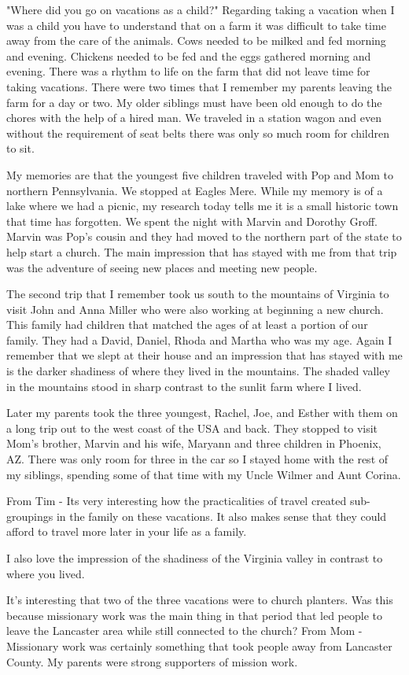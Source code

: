 "Where did you go on vacations as a child?"
Regarding taking a vacation when I was a child you have to understand that on a farm it was difficult to take time away from the care of the animals.
Cows needed to be milked and fed morning and evening.
Chickens needed to be fed and the eggs gathered morning and evening.
There was a rhythm to life on the farm that did not leave time for taking vacations.
There were two times that I remember my parents leaving the farm for a day or two.
My older siblings must have been old enough to do the chores with the help of a hired man.
We traveled in a station wagon and even without the requirement of seat belts there was only so much room for children to sit.

My memories are that the youngest five children traveled with Pop and Mom to northern Pennsylvania.
We stopped at Eagles Mere.
While my memory is of a lake where we had a picnic, my research today tells me it is a small historic town that time has forgotten.
We spent the night with Marvin and Dorothy Groff.
Marvin was Pop's cousin and they had moved to the northern part of the state to help start a church.
The main impression that has stayed with me from that trip was the adventure of seeing new places and meeting new people.

The second trip that I remember took us south to the mountains of Virginia to visit John and Anna Miller who were also working at beginning a new church.
This family had children that matched the ages of at least a portion of our family.
They had a David, Daniel, Rhoda and Martha who was my age.
Again I remember that we slept at their house and an impression that has stayed with me is the darker shadiness of where they lived in the mountains.
The shaded valley in the mountains stood in sharp contrast to the sunlit farm where I lived.

Later my parents took the three youngest, Rachel, Joe, and Esther with them on a long trip out to the west coast of the USA and back.
They stopped to visit Mom's brother, Marvin and his wife, Maryann and three children in Phoenix, AZ.
There was only room for three in the car so I stayed home with the rest of my siblings, spending some of that time with my Uncle Wilmer and Aunt Corina.

From Tim - Its very interesting how the practicalities of travel created sub-groupings in the family on these vacations.
It also makes sense that they could afford to travel more later in your life as a family.

I also love the impression of the shadiness of the Virginia valley in contrast to where you lived.

It's interesting that two of the three vacations were to church planters.
Was this because missionary work was the main thing in that period that led people to leave the Lancaster area while still connected to the church?
From Mom - Missionary work was certainly something that took people away from Lancaster County.
My parents were strong supporters of mission work.






